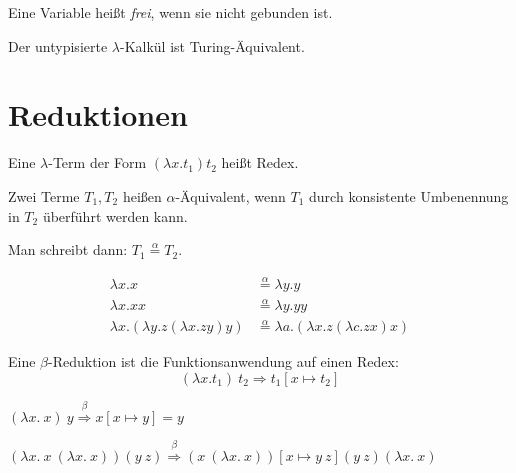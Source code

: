 \begin{definition}%
    Eine Variable heißt \textit{frei}, wenn sie nicht gebunden ist.
\end{definition}

\begin{satz}
    Der untypisierte $\lambda$-Kalkül ist Turing-Äquivalent.
\end{satz}

\section{Reduktionen}
\begin{definition}[Redex]%
    Eine $\lambda$-Term der Form $(\lambda x. t_1) t_2$ heißt Redex.
\end{definition}

\begin{definition}%
    Zwei Terme $T_1, T_2$ heißen $\alpha$-Äquivalent, wenn $T_1$ durch 
    konsistente Umbenennung in $T_2$ überführt werden kann.

    Man schreibt dann: $T_1 \overset{\alpha}{=} T_2$.
\end{definition}

\begin{beispiel}
    \begin{align*}
        \lambda x.x    &\overset{\alpha}{=} \lambda y. y\\
        \lambda x. x x &\overset{\alpha}{=} \lambda y. y y\\
        \lambda x. (\lambda y. z (\lambda x. z y) y) &\overset{\alpha}{=}
        \lambda a. (\lambda x. z (\lambda c. z x) x)
    \end{align*}
\end{beispiel}

\begin{definition}%
    Eine $\beta$-Reduktion ist die Funktionsanwendung auf einen Redex:
    \[(\lambda x. t_1)\ t_2 \Rightarrow t_1 [x \mapsto t_2]\]
\end{definition}

\begin{beispiel}
    \begin{defenum}
        \item $(\lambda x.\ x)\ y \overset{\beta}{\Rightarrow} x[x \mapsto y] = y$
        \item $(\lambda x.\ x\ (\lambda x.\ x)) (y\ z) \overset{\beta}{\Rightarrow} (x\ (\lambda x.\ x))[x \mapsto y\ z] (y\ z) (\lambda x.\ x)$
    \end{defenum}
\end{beispiel}


